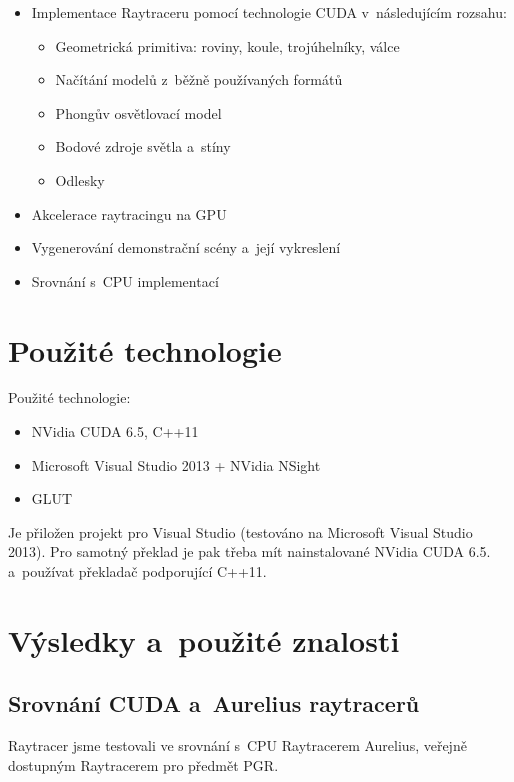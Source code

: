 \documentclass[12pt,a4paper,titlepage,final]{report}
\begin{document}
\begin{itemize}
	\item Implementace Raytraceru pomocí technologie CUDA v~následujícím rozsahu:
	\begin{itemize}
		\item Geometrická primitiva: roviny, koule, trojúhelníky, válce
		\item Načítání modelů z~běžně používaných formátů
		\item Phongův osvětlovací model
		\item Bodové zdroje světla a~stíny
		\item Odlesky
	\end{itemize}
	\item Akcelerace raytracingu na GPU
	\item Vygenerování demonstrační scény a~její vykreslení
	\item Srovnání s~CPU implementací
\end{itemize}

\section{Použité technologie}

Použité technologie:

\begin{itemize}
	\item NVidia CUDA 6.5, C++11
	\item Microsoft Visual Studio 2013 + NVidia NSight
	\item GLUT
\end{itemize}

Je přiložen projekt pro Visual Studio (testováno na Microsoft Visual Studio 2013). Pro samotný překlad je pak třeba mít nainstalované NVidia CUDA 6.5. a~používat překladač podporující C++11.

\section{Výsledky a~použité znalosti}

\subsection{Srovnání CUDA a~Aurelius raytracerů}

Raytracer jsme testovali ve srovnání s~CPU Raytracerem Aurelius, veřejně dostupným Raytracerem pro předmět PGR.
\end{document}
